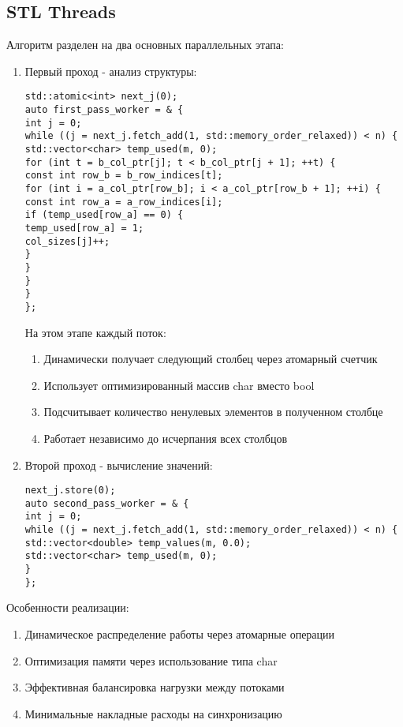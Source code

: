 \documentclass[12pt]{article}
\begin{document}
\subsection{STL Threads}
Алгоритм разделен на два основных параллельных этапа:
\begin{enumerate}
\item Первый проход - анализ структуры:
\begin{lstlisting}
std::atomic<int> next_j(0);
auto first_pass_worker = & {
int j = 0;
while ((j = next_j.fetch_add(1, std::memory_order_relaxed)) < n) {
std::vector<char> temp_used(m, 0);
for (int t = b_col_ptr[j]; t < b_col_ptr[j + 1]; ++t) {
const int row_b = b_row_indices[t];
for (int i = a_col_ptr[row_b]; i < a_col_ptr[row_b + 1]; ++i) {
const int row_a = a_row_indices[i];
if (temp_used[row_a] == 0) {
temp_used[row_a] = 1;
col_sizes[j]++;
}
}
}
}
};
\end{lstlisting}
На этом этапе каждый поток:
\begin{enumerate}
\item Динамически получает следующий столбец через атомарный счетчик
\item Использует оптимизированный массив char вместо bool
\item Подсчитывает количество ненулевых элементов в полученном столбце
\item Работает независимо до исчерпания всех столбцов
\end{enumerate}
\item Второй проход - вычисление значений:
\begin{lstlisting}
next_j.store(0);
auto second_pass_worker = & {
int j = 0;
while ((j = next_j.fetch_add(1, std::memory_order_relaxed)) < n) {
std::vector<double> temp_values(m, 0.0);
std::vector<char> temp_used(m, 0);
}
};
\end{lstlisting}
\end{enumerate}
Особенности реализации:
\begin{enumerate}
\item Динамическое распределение работы через атомарные операции
\item Оптимизация памяти через использование типа char
\item Эффективная балансировка нагрузки между потоками
\item Минимальные накладные расходы на синхронизацию
\end{enumerate}
\end{document}
